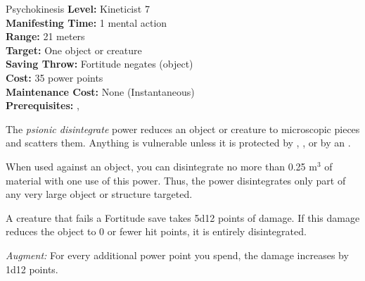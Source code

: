{Psychokinesis}
{
	\textbf{Level:}
	Kineticist 7\\
	\textbf{Manifesting Time:}
	1 mental action\\
	\textbf{Range:}
	21 meters\\
	\textbf{Target:}
	One object or creature\\
	\textbf{Saving Throw:}
	Fortitude negates (object)\\
	\textbf{Cost:}
	35 power points\\
	\textbf{Maintenance Cost:}
	None (Instantaneous)\\
	\textbf{Prerequisites:}
	, \\
}
{
	The \emph{psionic disintegrate} power reduces an object or creature to microscopic pieces and scatters them. Anything is vulnerable unless it is protected by , , or by an .

	When used against an object, you can disintegrate no more than 0.25 m$^3$ of material with one use of this power. Thus, the power disintegrates only part of any very large object or structure targeted.

	A creature that fails a Fortitude save takes 5d12 points of damage. If this damage reduces the object to 0 or fewer hit points, it is entirely disintegrated.

	\emph{Augment:} For every additional power point you spend, the damage increases by 1d12 points.
}